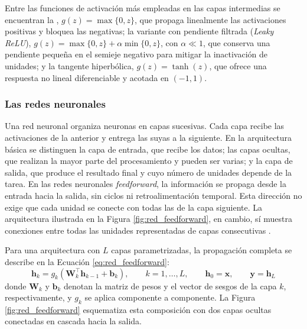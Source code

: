 Entre las funciones de activación más empleadas en las capas intermedias se encuentran la , $g(z) = \max\{0,z\}$, que propaga linealmente las activaciones positivas y bloquea las negativas; la variante con pendiente filtrada (\textit{Leaky ReLU}), $g(z) = \max\{0,z\} + \alpha\min\{0,z\}$, con $\alpha \ll 1$, que conserva una pendiente pequeña en el semieje negativo para mitigar la inactivación de unidades; y la tangente hiperbólica, $g(z) = \tanh(z)$, que ofrece una respuesta no lineal diferenciable y acotada en $(-1,1)$.

\subsubsection{Las redes neuronales}

Una red neuronal organiza neuronas en capas sucesivas. Cada capa recibe las activaciones de la anterior y entrega las suyas a la siguiente. En la arquitectura básica se distinguen la capa de entrada, que recibe los datos; las capas ocultas, que realizan la mayor parte del procesamiento y pueden ser varias; y la capa de salida, que produce el resultado final y cuyo número de unidades depende de la tarea. En las redes neuronales \textit{feedforward}, la información se propaga desde la entrada hacia la salida, sin ciclos ni retroalimentación temporal. Esta dirección no exige que cada unidad se conecte con todas las de la capa siguiente. La arquitectura ilustrada en la Figura \ref{fig:red_feedforward}, en cambio, sí muestra conexiones entre todas las unidades representadas de capas consecutivas \cite{goodfellow2016deep}.

Para una arquitectura con $L$ capas parametrizadas, la propagación completa se describe en la Ecuación \eqref{eq:red_feedforward}:
\begin{equation}
    \mathbf{h}_k = g_k\!\left(\mathbf{W}_k^{\top}\mathbf{h}_{k-1}+\mathbf{b}_k\right),
    \qquad k=1,\ldots,L,
    \qquad \mathbf{h}_0=\mathbf{x},
    \qquad \mathbf{y}=\mathbf{h}_L
    \label{eq:red_feedforward}
\end{equation}
donde $\mathbf{W}_k$ y $\mathbf{b}_k$ denotan la matriz de pesos y el vector de sesgos de la capa $k$, respectivamente, y $g_k$ se aplica componente a componente. La Figura \ref{fig:red_feedforward} esquematiza esta composición con dos capas ocultas conectadas en cascada hacia la salida.


